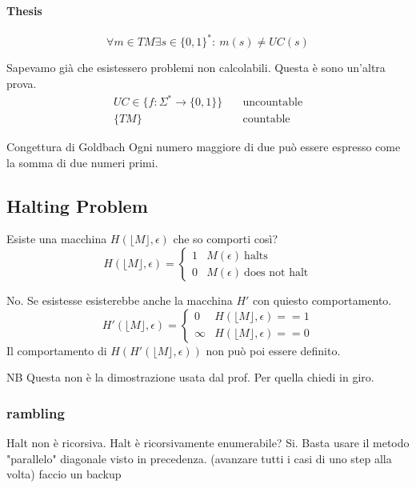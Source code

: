 \documentclass{article}
\newcommand{\floor}[1]{\ensuremath{\lfloor #1 \rfloor}}
\begin{document}
\paragraph{Thesis}
\[
    \forall m\in TM \exists s \in \{0,1\}^*:\ m(s)\neq UC(s)
\] 

\begin{callout}{}
    Sapevamo già che esistessero problemi non calcolabili. Questa è sono un'altra prova.
    \begin{align*}
        UC\in\{f:\Sigma^*\to\{0,1\}\} &\quad \text{uncountable} \\
        \{TM\} &\quad \text{countable}
    \end{align*}
\end{callout}

\begin{callout}{Congettura di Goldbach}
    Ogni numero maggiore di due può essere espresso come la somma di due numeri primi.
\end{callout}

\subsection{Halting Problem}
Esiste una macchina $H(\floor{M},\epsilon)$ che so comporti così?
$$
H(\floor{M},\epsilon) = \begin{cases}
    1 & M(\epsilon)\ \text{halts} \\
    0 & M(\epsilon)\ \text{does not halt} 
\end{cases}
$$

No. Se esistesse esisterebbe anche la macchina $H'$ con quiesto comportamento.
$$
H'(\floor{M},\epsilon) = \begin{cases}
    0 & H(\floor{M},\epsilon)==1 \\
    \infty & H(\floor{M},\epsilon)==0
\end{cases}
$$
Il comportamento di $H(H'(\floor{M},\epsilon))$ non può poi essere definito.

\begin{warning}{NB}
    Questa non è la dimostrazione usata dal prof. Per quella chiedi in giro.
\end{warning}

\subsubsection{rambling}
Halt non è ricorsiva. Halt è ricorsivamente enumerabile? Si. Basta usare il metodo "parallelo" diagonale visto in precedenza. (avanzare tutti i casi di uno step alla volta)
faccio un backup
\end{document}

